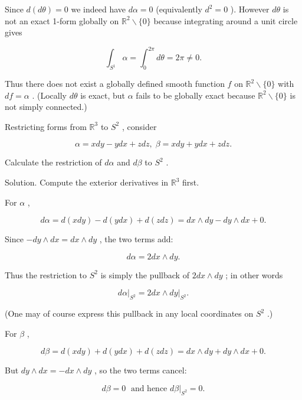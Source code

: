 \documentclass[10pt]{article}
\begin{document}
Since \(d\left( {d\theta }\right)  = 0\) we indeed have \({d\alpha } = 0\) (equivalently \({d}^{2} = 0\) ). However \({d\theta }\) is not an exact 1-form globally on \({\mathbb{R}}^{2} \smallsetminus  \{ 0\}\) because integrating around a unit circle gives

\[
{\int }_{{S}^{1}}\alpha  = {\int }_{0}^{2\pi }{d\theta } = {2\pi } \neq  0.
\]

Thus there does not exist a globally defined smooth function \(f\) on \({\mathbb{R}}^{2} \smallsetminus  \{ 0\}\) with \({df} = \alpha\) . (Locally \({d\theta }\) is exact, but \(\alpha\) fails to be globally exact because \({\mathbb{R}}^{2} \smallsetminus  \{ 0\}\) is not simply connected.)

\begin{problem}[title=PROBLEM 4 (5 POINTS)]
Restricting forms from \({\mathbb{R}}^{3}\) to \({S}^{2}\) , consider

\[
\alpha  = {xdy} - {ydx} + {zdz},\;\beta  = {xdy} + {ydx} + {zdz}.
\]

Calculate the restriction of \({d\alpha }\) and \({d\beta }\) to \({S}^{2}\) .
\end{problem}

Solution. Compute the exterior derivatives in \({\mathbb{R}}^{3}\) first.

For \(\alpha\) ,

\[
{d\alpha } = d\left( {xdy}\right)  - d\left( {ydx}\right)  + d\left( {zdz}\right)  = {dx} \land  {dy} - {dy} \land  {dx} + 0.
\]

Since \(- {dy} \land  {dx} = {dx} \land  {dy}\) , the two terms add:

\[
{d\alpha } = {2dx} \land  {dy}.
\]

Thus the restriction to \({S}^{2}\) is simply the pullback of \({2dx} \land  {dy}\) ; in other words

\[
{\left. d\alpha \right| }_{{S}^{2}} = {\left. 2dx \land  dy\right| }_{{S}^{2}}.
\]

(One may of course express this pullback in any local coordinates on \({S}^{2}\) .)

For \(\beta\) ,

\[
{d\beta } = d\left( {xdy}\right)  + d\left( {ydx}\right)  + d\left( {zdz}\right)  = {dx} \land  {dy} + {dy} \land  {dx} + 0.
\]

But \({dy} \land  {dx} =  - {dx} \land  {dy}\) , so the two terms cancel:

\[
{d\beta } = 0\;\text{ and hence }{\left. d\beta \right| }_{{S}^{2}} = 0.
\]
\end{document}
